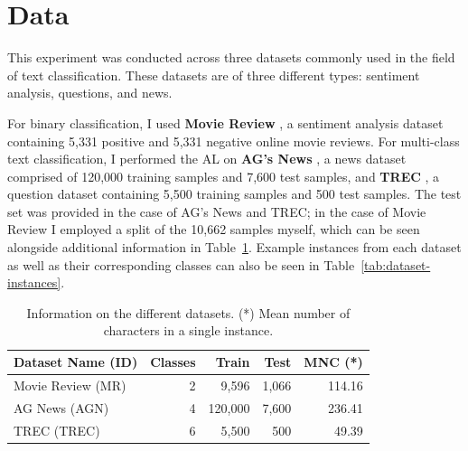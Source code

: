 \documentclass[english,bachelor,ul]{webisthesis} %
\begin{document}
\section{Data}

This experiment was conducted across three datasets commonly used in the field of text classification. These datasets are of three different types: sentiment analysis, questions, and news. 

For binary classification, I used \textbf{Movie Review} \citep{DBLP:conf/acl/PangL05}, a sentiment analysis dataset containing 5,331 positive and 5,331 negative online movie reviews. For multi-class text classification, I performed the AL on \textbf{AG's News} \citep{DBLP:conf/nips/ZhangZL15}, a news dataset comprised of 120,000 training samples and 7,600 test samples, and \textbf{TREC} \citep{DBLP:journals/nle/LiR06}, a question dataset containing 5,500 training samples and 500 test samples. The test set was provided in the case of AG's News and TREC; in the case of Movie Review I employed a split of the 10,662 samples myself, which can be seen alongside additional information in Table~\ref{tab:dataset-table}. Example instances from each dataset as well as their corresponding classes can also be seen in Table~\ref{tab:dataset-instances}.

\vspace{1\baselineskip}

\begin{table}[htpb]
    \centering
    \setlength{\tabcolsep}{16pt} %
    \begin{tabular}{@{}lrrrr@{}} %
        \toprule
        \bfseries Dataset Name \scriptsize (ID) & \bfseries Classes & \bfseries Train & \bfseries Test & \bfseries MNC (*) \\
        \midrule
        Movie Review \scriptsize (MR) & 2 & 9,596 & 1,066 & 114.16 \\
        AG News \scriptsize (AGN) & 4 & 120,000 & 7,600 &  236.41 \\
        TREC \scriptsize (TREC) & 6 & 5,500 & 500 & 49.39 \\
        \bottomrule
    \end{tabular}
    \caption{Information on the different datasets. (*) Mean number of characters in a single instance.}
  \label{tab:dataset-table}%
\end{table}
\end{document}
